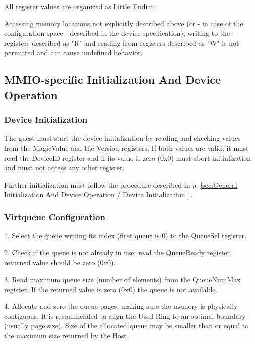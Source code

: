 All register values are organized as Little Endian.

Accessing memory locations not explicitly described above (or
- in case of the configuration space - described in the device
specification), writing to the registers described as "R" and
reading from registers described as "W" is not permitted and
can cause undefined behavior.

\subsection{MMIO-specific Initialization And Device Operation}\label{sec:Virtio Transport Options / Virtio Over MMIO / MMIO-specific Initialization And Device Operation}

\subsubsection{Device Initialization}\label{sec:Virtio Transport Options / Virtio Over MMIO / MMIO-specific Initialization And Device Operation / Device Initialization}

The guest must start the device initialization by reading and
checking values from the MagicValue and the Version registers.
If both values are valid, it must read the DeviceID register
and if its value is zero (0x0) must abort initialization and
must not access any other register.

Further initialization must follow the procedure described in
p. \ref{sec:General Initialization And Device Operation / Device Initialization}~.

\subsubsection{Virtqueue Configuration}\label{sec:Virtio Transport Options / Virtio Over MMIO / MMIO-specific Initialization And Device Operation / Virtqueue Configuration}

1. Select the queue writing its index (first queue is 0) to the
   QueueSel register.

2. Check if the queue is not already in use: read the QueueReady
   register, returned value should be zero (0x0).

3. Read maximum queue size (number of elements) from the
   QueueNumMax register. If the returned value is zero (0x0) the
   queue is not available.

4. Allocate and zero the queue pages, making sure the memory
   is physically contiguous. It is recommended to align the
   Used Ring to an optimal boundary (usually page size).
   Size of the allocated queue may be smaller than or equal to
   the maximum size returned by the Host.


